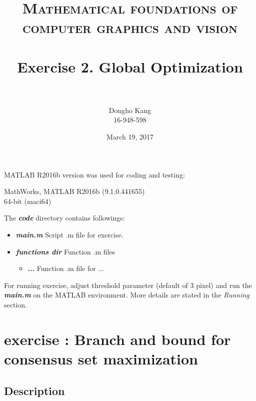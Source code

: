 \documentclass[paper=a4, fontsize=11pt]{scrartcl} %
\title{	
\normalfont \normalsize 
\textsc{Mathematical foundations of computer graphics and vision} \\ [25pt] %
\horrule{0.5pt} \\[0.4cm] %
\huge Exercise 2. Global Optimization \\ %
\horrule{2pt} \\[0.5cm] %
}
\author{Dongho Kang \\ \small 16-948-598} %
\date{\normalsize March 19, 2017} %
\numberwithin{equation}{section} %
\numberwithin{figure}{section} %
\numberwithin{table}{section} %
\newcommand{\filename}[1]{\textbf{\textit{#1}}}
\newcommand{\funcname}[1]{\textbf{#1}}
\begin{document}
\maketitle %


MATLAB R2016b version was used for coding and testing:

\begin{center}
MathWorks, MATLAB R2016b (9.1.0.441655) \\
64-bit (maci64) 
\end{center}

The \filename{code} directory contains followings:

\begin{itemize}
	\item \filename{main.m} \quad Script .m file for exercise.
	\item \filename{functions dir} \quad Function .m files 
		\begin{itemize}
			\item \funcname{...} \quad Function .m file for ...
		\end{itemize}
\end{itemize}

For running exercise, adjust threshold parameter (default of 3 pixel) and run the \filename{main.m} on the MATLAB environment. More details are stated in the \textit{Running} section.


\section{exercise : Branch and bound for consensus set maximization}

\subsection{Description}
\end{document}
